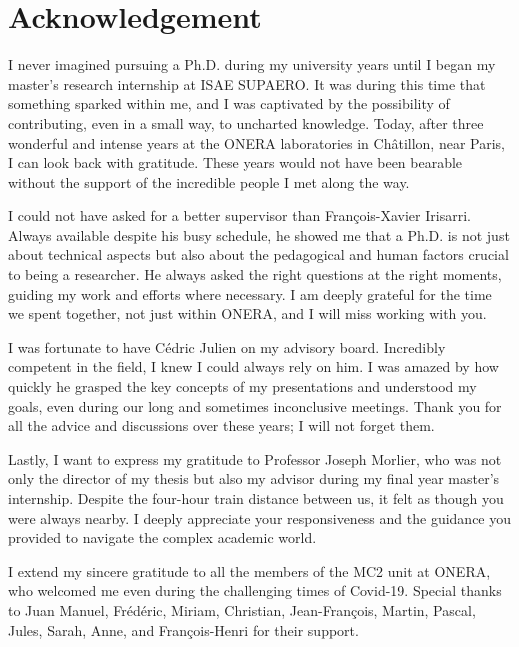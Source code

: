 \newpage



\chapter*{Acknowledgement}
{}%
%
I never imagined pursuing a Ph.D. during my university years until I began my master's research internship at ISAE SUPAERO. It was during this time that something sparked within me, and I was captivated by the possibility of contributing, even in a small way, to uncharted knowledge. Today, after three wonderful and intense years at the ONERA laboratories in Châtillon, near Paris, I can look back with gratitude. These years would not have been bearable without the support of the incredible people I met along the way.

I could not have asked for a better supervisor than François-Xavier Irisarri. Always available despite his busy schedule, he showed me that a Ph.D. is not just about technical aspects but also about the pedagogical and human factors crucial to being a researcher. He always asked the right questions at the right moments, guiding my work and efforts where necessary. I am deeply grateful for the time we spent together, not just within ONERA, and I will miss working with you.

I was fortunate to have Cédric Julien on my advisory board. Incredibly competent in the field, I knew I could always rely on him. I was amazed by how quickly he grasped the key concepts of my presentations and understood my goals, even during our long and sometimes inconclusive meetings. Thank you for all the advice and discussions over these years; I will not forget them.

Lastly, I want to express my gratitude to Professor Joseph Morlier, who was not only the director of my thesis but also my advisor during my final year master's internship. Despite the four-hour train distance between us, it felt as though you were always nearby. I deeply appreciate your responsiveness and the guidance you provided to navigate the complex academic world.

I extend my sincere gratitude to all the members of the MC2 unit at ONERA, who welcomed me even during the challenging times of Covid-19. Special thanks to Juan Manuel, Frédéric, Miriam, Christian, Jean-François, Martin, Pascal, Jules, Sarah, Anne, and François-Henri for their support.

